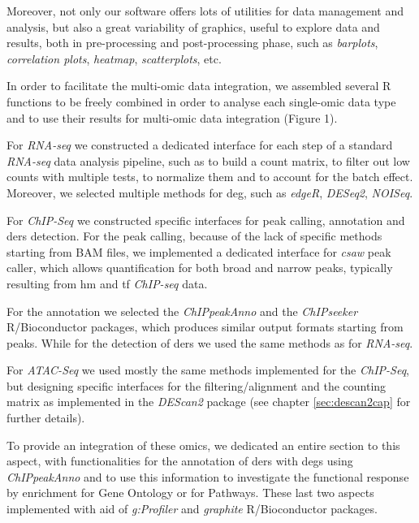 Moreover, not only our software offers lots of utilities for data management and analysis, but also a great variability of graphics, useful to explore data and results, both in pre-processing and post-processing phase, such as \textit{barplots}, \textit{correlation plots}, \textit{heatmap}, \textit{scatterplots}, etc.

In order to facilitate the multi-omic data integration, we assembled several R functions to be freely combined in order to analyse each single-omic data type and to use their results for multi-omic data integration (Figure 1).

For \textit{RNA-seq} we constructed a dedicated interface for each step of a standard \textit{RNA-seq} data analysis pipeline, such as to build a count matrix, to filter out low counts with multiple tests, to normalize them and to account for the batch effect.
Moreover, we selected multiple methods for \gls{deg}, such as \textit{edgeR}, \textit{DESeq2}, \textit{NOISeq}.

For \textit{ChIP-Seq} we constructed specific interfaces for peak calling, annotation and \glspl{der} detection.
For the peak calling, because of the lack of specific methods starting from BAM files, we implemented a dedicated interface for \textit{csaw}\cite{Lun2015} peak caller, which allows quantification for both broad and narrow peaks, typically resulting from \gls{hm} and \gls{tf} \textit{ChIP-seq} data.

For the annotation we selected the \textit{ChIPpeakAnno} and the \textit{ChIPseeker} R/Bioconductor packages, which produces similar output formats starting from peaks.
While for the detection of \glspl{der} we used the same methods as for \textit{RNA-seq}.

For \textit{ATAC-Seq} we used mostly the same methods implemented for the \textit{ChIP-Seq}, but designing specific interfaces for the filtering/alignment and the counting matrix as implemented in the \textit{DEScan2} package (see chapter \ref{sec:descan2cap} for further details).

To provide an integration of these omics, we dedicated an entire section to this aspect, with functionalities for the annotation of \glspl{der} with \glspl{deg} using \textit{ChIPpeakAnno} and to use this information to investigate the functional response by enrichment for Gene Ontology or for Pathways.
These last two aspects implemented with aid of \textit{g:Profiler} \cite{Reimand2016} and \textit{graphite} \cite{Sales2012a} R/Bioconductor packages.
